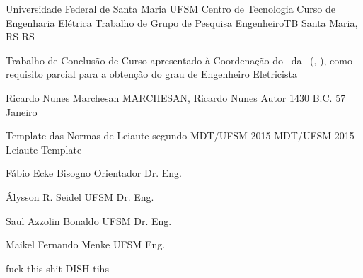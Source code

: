\set{\universidade}				{Universidade Federal de Santa Maria}
\set{\universidadeSigla}		{UFSM}
\set{\centroCurso}				{Centro de Tecnologia}
\set{\departamentoPrograma}		{Curso de Engenharia Elétrica}
\set{\grauTrabalho}				{Trabalho de Grupo de Pesquisa}
\set{\grauTitulacao}			{EngenheiroTB}
\set{\cidadeCEP}				{Santa Maria, RS}
\set{\estadoCEP}				{RS}

\set{\textoFolhaRosto}			{Trabalho de Conclusão de Curso apresentado à Coordenação do \departamentoPrograma\ da \universidade\ (\universidadeSigla , \estadoCEP), como requisito parcial para a obtenção do grau de}
\set{\grauFolhaRosto}			{Engenheiro Eletricista}


\set{\autor}					{Ricardo Nunes Marchesan}
\set{\autorCitacao}				{MARCHESAN, Ricardo Nunes}
\set{\autorGenero}				{Autor}
\set{\ano}						{1430 B.C.}
\set{\diaDefesa}				{57}
\set{\mesDefesa}				{Janeiro}

\set{\tituloTrabalho}			{Template das Normas de Leiaute segundo MDT/UFSM 2015}
\set{\tituloTrabalhoEn}			{MDT/UFSM 2015 Leiaute Template}


\set{\orientador}				{Fábio Ecke Bisogno}
\set{\orientadorGenero}			{Orientador}
\set{\orientadorTitulo}			{Dr. Eng.}

\set{\bancaUm}					{Álysson R. Seidel}
\set{\bancaUmSigla}				{UFSM}
\set{\bancaUmTitulo}			{Dr. Eng.}

\set{\bancaDois}				{Saul Azzolin Bonaldo}
\set{\bancaDoisSigla}			{UFSM}
\set{\bancaDoisTitulo}			{Dr. Eng.}

\set{\bancaTres}				{Maikel Fernando Menke}
\set{\bancaTresSigla}			{UFSM}
\set{\bancaTresTitulo}			{Eng.}

\set{\bancaQuatro}				{fuck this shit}
\set{\bancaQuatroSigla}			{DISH}
\set{\bancaQuatroTitulo}		{tihs}
